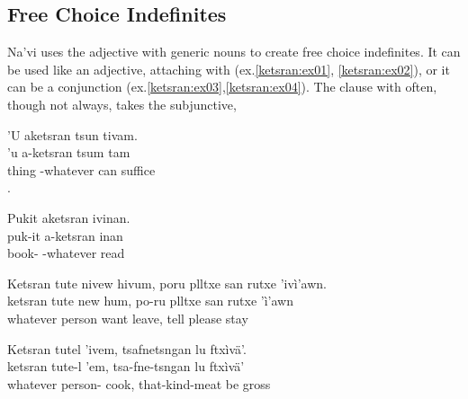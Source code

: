 \subsection{Free Choice Indefinites} Na'vi uses the adjective
  with generic nouns to
create free choice indefinites.  It can be used like an adjective,
attaching with  (ex.\ref{ketsran:ex01}, \ref{ketsran:ex02}), or
it can be a conjunction (ex.\ref{ketsran:ex03},\ref{ketsran:ex04}).
The clause with  often, though not always, takes the
subjunctive,

\begin{interlin} \label{ketsran:ex01}
\glll 'U aketsran tsun tivam. \\
     'u a-ketsran tsum tam \\
     thing -whatever can suffice \\
. \Ipawl{}
\end{interlin}

\begin{interlin} \label{ketsran:ex02}
\glll Pukit aketsran ivinan. \\
    puk-it a-ketsran inan \\
    book- -whatever read \\
 \Ipawl{}
\end{interlin}

\begin{interlin} \label{ketsran:ex03}
\glll Ketsran tute nivew hivum, poru plltxe san rutxe 'ivì'awn. \\
ketsran tute new hum, po-ru plltxe san rutxe 'ì'awn\\
whatever person want leave,  tell  please stay \\
 \Ipawl{}
\end{interlin}

\begin{interlin} \label{ketsran:ex04}
\glll Ketsran tutel 'ivem, tsafnetsngan lu ftxìvä'. \\
   ketsran tute-l 'em, tsa-fne-tsngan lu ftxìvä' \\
   whatever person- cook, that-kind-meat be gross \\
 \Ipawl{}
\end{interlin}


